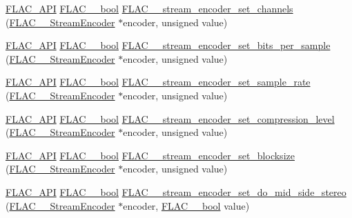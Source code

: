 \begin{DoxyCompactItemize}
\item 
\hyperlink{group__flac__export_ga56ca07df8a23310707732b1c0007d6f5}{F\+L\+A\+C\+\_\+\+A\+PI} \hyperlink{ordinals_8h_a95103469f1cbd78b8cf250194985b34e}{F\+L\+A\+C\+\_\+\+\_\+bool} \hyperlink{group__flac__stream__encoder_gabfc9c883c124a849b5b42a87c30e10a5}{F\+L\+A\+C\+\_\+\+\_\+stream\+\_\+encoder\+\_\+set\+\_\+channels} (\hyperlink{struct_f_l_a_c_____stream_encoder}{F\+L\+A\+C\+\_\+\+\_\+\+Stream\+Encoder} $\ast$encoder, unsigned value)
\item 
\hyperlink{group__flac__export_ga56ca07df8a23310707732b1c0007d6f5}{F\+L\+A\+C\+\_\+\+A\+PI} \hyperlink{ordinals_8h_a95103469f1cbd78b8cf250194985b34e}{F\+L\+A\+C\+\_\+\+\_\+bool} \hyperlink{group__flac__stream__encoder_ga5a21cf7f86a81df6ba72714a6b917aa3}{F\+L\+A\+C\+\_\+\+\_\+stream\+\_\+encoder\+\_\+set\+\_\+bits\+\_\+per\+\_\+sample} (\hyperlink{struct_f_l_a_c_____stream_encoder}{F\+L\+A\+C\+\_\+\+\_\+\+Stream\+Encoder} $\ast$encoder, unsigned value)
\item 
\hyperlink{group__flac__export_ga56ca07df8a23310707732b1c0007d6f5}{F\+L\+A\+C\+\_\+\+A\+PI} \hyperlink{ordinals_8h_a95103469f1cbd78b8cf250194985b34e}{F\+L\+A\+C\+\_\+\+\_\+bool} \hyperlink{group__flac__stream__encoder_ga108c3f4fbdcaa744ddbb125f91cb3838}{F\+L\+A\+C\+\_\+\+\_\+stream\+\_\+encoder\+\_\+set\+\_\+sample\+\_\+rate} (\hyperlink{struct_f_l_a_c_____stream_encoder}{F\+L\+A\+C\+\_\+\+\_\+\+Stream\+Encoder} $\ast$encoder, unsigned value)
\item 
\hyperlink{group__flac__export_ga56ca07df8a23310707732b1c0007d6f5}{F\+L\+A\+C\+\_\+\+A\+PI} \hyperlink{ordinals_8h_a95103469f1cbd78b8cf250194985b34e}{F\+L\+A\+C\+\_\+\+\_\+bool} \hyperlink{group__flac__stream__encoder_ga03495bcd0aae71116c701b0dcf311c4b}{F\+L\+A\+C\+\_\+\+\_\+stream\+\_\+encoder\+\_\+set\+\_\+compression\+\_\+level} (\hyperlink{struct_f_l_a_c_____stream_encoder}{F\+L\+A\+C\+\_\+\+\_\+\+Stream\+Encoder} $\ast$encoder, unsigned value)
\item 
\hyperlink{group__flac__export_ga56ca07df8a23310707732b1c0007d6f5}{F\+L\+A\+C\+\_\+\+A\+PI} \hyperlink{ordinals_8h_a95103469f1cbd78b8cf250194985b34e}{F\+L\+A\+C\+\_\+\+\_\+bool} \hyperlink{group__flac__stream__encoder_gae6c001cd7601192334c58ee3631b571f}{F\+L\+A\+C\+\_\+\+\_\+stream\+\_\+encoder\+\_\+set\+\_\+blocksize} (\hyperlink{struct_f_l_a_c_____stream_encoder}{F\+L\+A\+C\+\_\+\+\_\+\+Stream\+Encoder} $\ast$encoder, unsigned value)
\item 
\hyperlink{group__flac__export_ga56ca07df8a23310707732b1c0007d6f5}{F\+L\+A\+C\+\_\+\+A\+PI} \hyperlink{ordinals_8h_a95103469f1cbd78b8cf250194985b34e}{F\+L\+A\+C\+\_\+\+\_\+bool} \hyperlink{group__flac__stream__encoder_gadbd1084da109cf0ddd007a5c64027504}{F\+L\+A\+C\+\_\+\+\_\+stream\+\_\+encoder\+\_\+set\+\_\+do\+\_\+mid\+\_\+side\+\_\+stereo} (\hyperlink{struct_f_l_a_c_____stream_encoder}{F\+L\+A\+C\+\_\+\+\_\+\+Stream\+Encoder} $\ast$encoder, \hyperlink{ordinals_8h_a95103469f1cbd78b8cf250194985b34e}{F\+L\+A\+C\+\_\+\+\_\+bool} value)

\end{DoxyCompactItemize}
